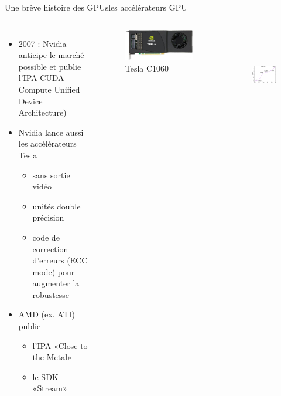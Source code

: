 \documentclass[11pt,mathserif]{beamer}
\newcommand{\harritu}{\faExclamation}
\begin{document}
\begin{frame}{Une brève histoire des GPUs}{les accélérateurs GPU}
  \begin{columns}[t]
    \column{6cm}
    \begin{itemize}[<+->]
      \item 2007 : Nvidia anticipe le marché possible et publie l'IPA CUDA
         Compute Unified Device Architecture)
      \item Nvidia lance aussi les accélérateurs Tesla
        \begin{itemize}
          \item sans sortie vidéo \harritu
          \item unités double précision
          \item code de correction d'erreurs (ECC mode) pour augmenter la robustesse
         \end{itemize}
       \item AMD (ex. ATI) publie
        \begin{itemize}
          \item l'IPA «Close to the Metal»
          \item le SDK «Stream»
        \end{itemize}
    \end{itemize} 
    \column{5cm}
\pause
\begin{figure}[htbp]
  \includegraphics[width=0.7\linewidth]{fig/C1060.jpg}
      \caption{\tiny Tesla C1060}
 \end{figure}
\begin{figure}[htbp]
  \includegraphics[height=4cm, width=0.9\linewidth]{fig/archis.eps}
 \end{figure}
  \end{columns}
\end{frame}
\end{document}
